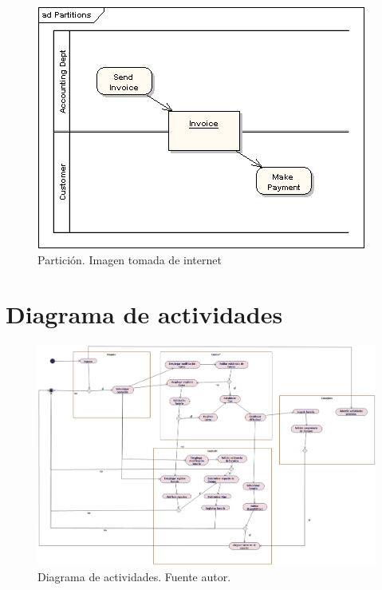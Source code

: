 \begin{itemize}
\begin{figure}[H]
	\centering
	\includegraphics[width=0.5\linewidth]{diseno/actividades/imgs/7}
	\caption{Partición. Imagen tomada de internet}
	\label{fig:gantt}
\end{figure}
\end{itemize}
\section{Diagrama de actividades}
\begin{figure}[H]
	\centering
	\includegraphics[width=1\linewidth]{diseno/actividades/imgs/actividades}
	\caption{Diagrama de actividades. Fuente autor.}
	\label{fig:gantt}
\end{figure}